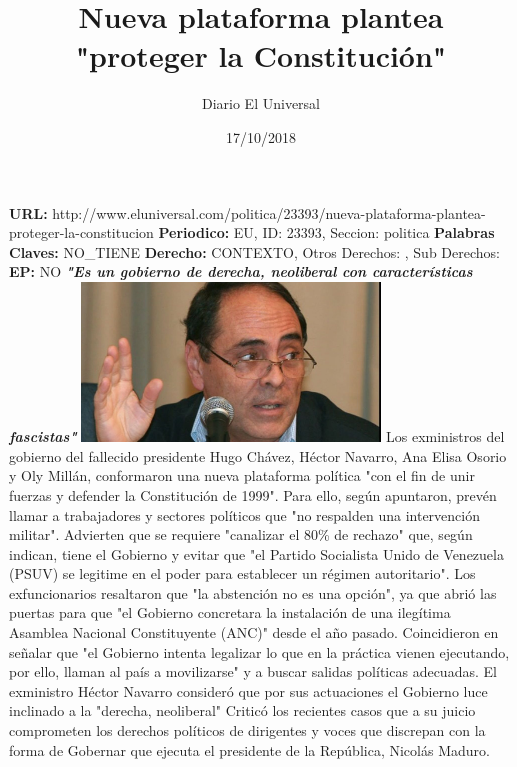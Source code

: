 \documentclass{article}%
\title{\textbf{Nueva plataforma plantea "proteger la Constitución"}}%
\author{Diario El Universal}%
\date{17/10/2018}%
\begin{document}
%
\normalsize%
\maketitle%
\textbf{URL: }%
http://www.eluniversal.com/politica/23393/nueva{-}plataforma{-}plantea{-}proteger{-}la{-}constitucion\newline%
%
\textbf{Periodico: }%
EU, %
ID: %
23393, %
Seccion: %
politica\newline%
%
\textbf{Palabras Claves: }%
NO\_TIENE\newline%
%
\textbf{Derecho: }%
CONTEXTO, %
Otros Derechos: %
, %
Sub Derechos: %
\newline%
%
\textbf{EP: }%
NO\newline%
\newline%
%
\textbf{\textit{"Es un gobierno de derecha, neoliberal con características fascistas"}}%
\newline%
\newline%
%
\includegraphics[width=300px]{31.jpg}%
\newline%
%
Los exministros del gobierno del fallecido presidente Hugo Chávez, Héctor Navarro, Ana Elisa Osorio y Oly Millán, conformaron una nueva plataforma política "con el fin de unir fuerzas y defender la Constitución de 1999".%
\newline%
%
Para ello, según apuntaron, prevén llamar a trabajadores y sectores políticos que "no respalden una intervención militar".\newline%
Advierten que se requiere "canalizar el 80\% de rechazo" que, según indican, tiene el Gobierno y evitar que "el Partido Socialista Unido de Venezuela (PSUV) se legitime en el poder para establecer un régimen autoritario".%
\newline%
%
Los exfuncionarios resaltaron que "la abstención no es una opción", ya que abrió las puertas para que "el Gobierno concretara la instalación de una ilegítima Asamblea Nacional Constituyente (ANC)" desde el año pasado.%
\newline%
%
Coincidieron en señalar que "el Gobierno intenta legalizar lo que en la práctica vienen ejecutando, por ello, llaman al país a movilizarse" y a buscar salidas políticas adecuadas.%
\newline%
%
El exministro Héctor Navarro consideró que por sus actuaciones el Gobierno luce inclinado a la "derecha, neoliberal"\newline%
Criticó los recientes casos que a su juicio comprometen los derechos políticos de dirigentes y voces que discrepan con la forma de Gobernar que ejecuta el presidente de la República, Nicolás Maduro.%
\newline%
%
\end{document}
